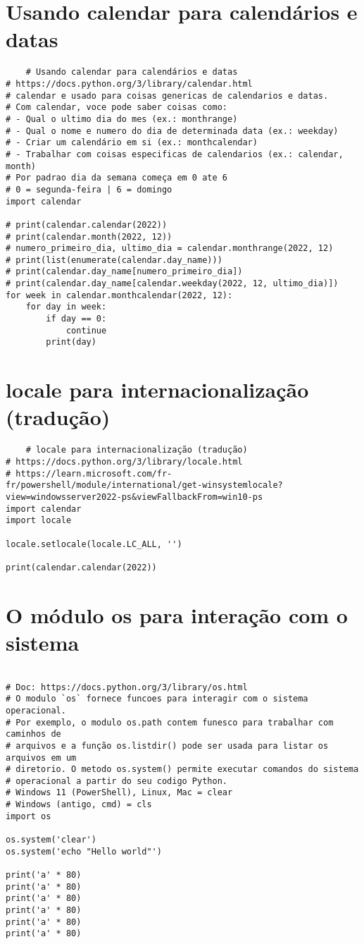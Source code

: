 \documentclass{article}
\begin{document}
\section{Usando calendar para calendários e datas}
\begin{lstlisting}
    # Usando calendar para calendários e datas
# https://docs.python.org/3/library/calendar.html
# calendar e usado para coisas genericas de calendarios e datas.
# Com calendar, voce pode saber coisas como:
# - Qual o ultimo dia do mes (ex.: monthrange)
# - Qual o nome e numero do dia de determinada data (ex.: weekday)
# - Criar um calendário em si (ex.: monthcalendar)
# - Trabalhar com coisas especificas de calendarios (ex.: calendar, month)
# Por padrao dia da semana começa em 0 ate 6
# 0 = segunda-feira | 6 = domingo
import calendar

# print(calendar.calendar(2022))
# print(calendar.month(2022, 12))
# numero_primeiro_dia, ultimo_dia = calendar.monthrange(2022, 12)
# print(list(enumerate(calendar.day_name)))
# print(calendar.day_name[numero_primeiro_dia])
# print(calendar.day_name[calendar.weekday(2022, 12, ultimo_dia)])
for week in calendar.monthcalendar(2022, 12):
    for day in week:
        if day == 0:
            continue
        print(day)
\end{lstlisting}

\section{locale para internacionalização (tradução)}
\begin{lstlisting}
    # locale para internacionalização (tradução)
# https://docs.python.org/3/library/locale.html
# https://learn.microsoft.com/fr-fr/powershell/module/international/get-winsystemlocale?view=windowsserver2022-ps&viewFallbackFrom=win10-ps
import calendar
import locale

locale.setlocale(locale.LC_ALL, '')

print(calendar.calendar(2022))
\end{lstlisting}

\section{O módulo os para interação com o sistema}
\begin{lstlisting}
    
# Doc: https://docs.python.org/3/library/os.html
# O modulo `os` fornece funcoes para interagir com o sistema operacional.
# Por exemplo, o modulo os.path contem funesco para trabalhar com caminhos de
# arquivos e a função os.listdir() pode ser usada para listar os arquivos em um
# diretorio. O metodo os.system() permite executar comandos do sistema
# operacional a partir do seu codigo Python.
# Windows 11 (PowerShell), Linux, Mac = clear
# Windows (antigo, cmd) = cls
import os

os.system('clear')
os.system('echo "Hello world"')

print('a' * 80)
print('a' * 80)
print('a' * 80)
print('a' * 80)
print('a' * 80)
print('a' * 80)
\end{lstlisting}
\end{document}
